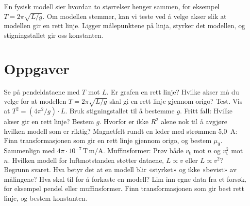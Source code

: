 \documentclass[11pt]{article}
\begin{document}

En fysisk modell sier hvordan to størrelser henger sammen, for eksempel $T = 2π\sqrt{L/g}$. Om modellen stemmer, kan vi teste ved å velge akser slik at modellen gir en rett linje. Ligger målepunktene på linja, styrker det modellen, og stigningstallet gir oss konstanten.

\section*{Oppgaver}

\begin{oppgaveliste}
\oppgave {}Se på pendeldataene med $T$ mot $L$. Er grafen en rett linje? Hvilke akser må du velge for at modellen $T = 2π\sqrt{L/g}$ skal gi en rett linje gjennom origo? Test.
\svar
\oppgave {}Vis at $T^{2} = (4π^{2}/g) \cdot L$. Bruk stigningstallet til å bestemme $g$.
\svar
\oppgave {}Fritt fall: Hvilke akser gir en rett linje? Bestem $g$. Hvorfor er ikke $R^{2}$ alene nok til å avgjøre hvilken modell som er riktig?
\svar
\oppgave {}Magnetfelt rundt en leder med strømmen 5,0~A: Finn transformasjonen som gir en rett linje gjennom origo, og bestem $μ_{0}$. Sammenlign med $4π \cdot 10^{-7}\,\mathrm{T\,m/A}$.
\svar
\oppgave {}Muffinsformer: Prøv både $v_{\mathrm{t}}$ mot $n$ og $v_{\mathrm{t}}^{2}$ mot $n$. Hvilken modell for luftmotstanden støtter dataene, $L \propto v$ eller $L \propto v^{2}$? Begrunn svaret.
\svar
\oppgave {}Hva betyr det at en modell blir «styrket» og ikke «bevist» av målingene? Hva skal til for å forkaste en modell?
\svar
\oppgave {}Lim inn egne data fra et forsøk, for eksempel pendel eller muffinsformer. Finn transformasjonen som gir best rett linje, og bestem konstanten.
\svar
\end{oppgaveliste}
\end{document}
